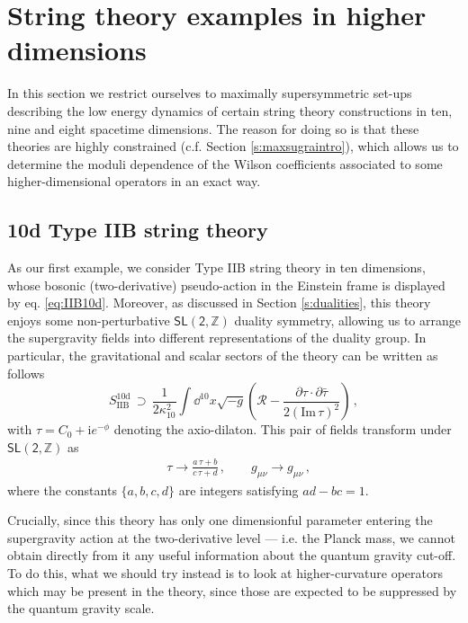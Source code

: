\section{String theory examples in higher dimensions}
\label{s:Exampleshighdim}

In this section we restrict ourselves to maximally supersymmetric set-ups describing the low energy dynamics of certain string theory constructions in ten, nine and eight spacetime dimensions. The reason for doing so is that these theories are highly constrained (c.f. Section \ref{s:maxsugraintro}), which allows us to determine the moduli dependence of the Wilson coefficients associated to some higher-dimensional operators in an exact way. %

\subsection{ 10d Type IIB string theory}
\label{ss:10dIIB}

As our first example, we consider Type IIB string theory in ten dimensions, whose bosonic (two-derivative) pseudo-action in the Einstein frame is displayed by eq. \eqref{eq:IIB10d}. Moreover, as discussed in Section \ref{s:dualities}, this theory enjoys some non-perturbative $\mathsf{SL(2,\mathbb{Z})}$ duality symmetry, allowing us to arrange the supergravity fields into different representations of the duality group. In particular, the gravitational and scalar sectors of the theory can be written as follows 
%
\begin{equation}\label{eq:IIB10dSL2}
	S_\text{IIB}^{\text{10d}}\, \supset\, \frac{1}{2\kappa_{10}^2} \int \dd^{10}x\sqrt{-g} \left(\mathcal{R}-\frac{\partial \tau \cdot \partial \bar \tau}{2 (\text{Im}\, \tau)^2}\right)\, ,
\end{equation}
%
with $\tau=C_0 + \text{i} e^{-\phi}$ denoting the axio-dilaton. This pair of fields transform under $\mathsf{SL(2,\mathbb{Z})}$ as \cite{Schwarz:1995dk}
%
\begin{align}\label{eq:SdualitytransIIBdilaton}
	&\tau \rightarrow \frac{a\, \tau + b}{c\, \tau+d}\,,\qquad g_{\mu \nu} \rightarrow g_{\mu \nu}\, ,
\end{align}
%
where the constants $\{ a, b, c, d\}$ are integers satisfying $ad-bc=1$.

Crucially, since this theory has only one dimensionful parameter entering the supergravity action at the two-derivative level --- i.e. the Planck mass, we cannot obtain directly from it any useful information about the quantum gravity cut-off. To do this, what we should try instead is to look at higher-curvature operators which may be present in the theory, since those are expected to be suppressed by the quantum gravity scale.

